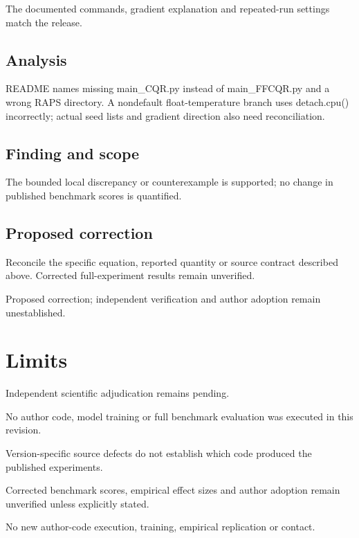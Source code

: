 \documentclass[11pt]{article}
\begin{document}
The documented commands, gradient explanation and repeated-run settings match the release.

\subsection*{Analysis}

README names missing main\_CQR.py instead of main\_FFCQR.py and a wrong RAPS directory. A nondefault float-temperature branch uses detach.cpu() incorrectly; actual seed lists and gradient direction also need reconciliation.

\subsection*{Finding and scope}

The bounded local discrepancy or counterexample is supported; no change in published benchmark scores is quantified.

\subsection*{Proposed correction}

Reconcile the specific equation, reported quantity or source contract described above. Corrected full-experiment results remain unverified.

Proposed correction; independent verification and author adoption remain unestablished.

\section*{Limits}

Independent scientific adjudication remains pending.\par

No author code, model training or full benchmark evaluation was executed in this revision.\par

Version-specific source defects do not establish which code produced the published experiments.\par

Corrected benchmark scores, empirical effect sizes and author adoption remain unverified unless explicitly stated.\par

No new author-code execution, training, empirical replication or contact.\par
\end{document}
